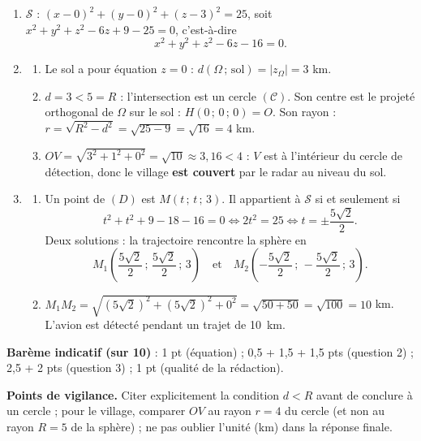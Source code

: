 \documentclass[11pt]{article}
\begin{document}
\begin{corrige}
\begin{enumerate}
\item $\mathcal{S}$ : $(x-0)^2+(y-0)^2+(z-3)^2=25$, soit $x^2+y^2+z^2-6z+9-25=0$, c'est-à-dire
\[x^2+y^2+z^2-6z-16=0.\]
\item 
\begin{enumerate}
\item Le sol a pour équation $z=0$ : $d(\Omega\,;\,\text{sol})=|z_\Omega|=3$ km.
\item $d=3<5=R$ : l'intersection est un cercle $(\mathcal{C})$. Son centre est le projeté orthogonal de $\Omega$ sur le sol : $H(0\,;\,0\,;\,0)=O$. Son rayon : $r=\sqrt{R^2-d^2}=\sqrt{25-9}=\sqrt{16}=4$ km.
\item $OV=\sqrt{3^2+1^2+0^2}=\sqrt{10}\approx 3{,}16<4$ : $V$ est à l'intérieur du cercle de détection, donc le village \textbf{est couvert} par le radar au niveau du sol.
\end{enumerate}
\item 
\begin{enumerate}
\item Un point de $(D)$ est $M(t\,;\,t\,;\,3)$. Il appartient à $\mathcal{S}$ si et seulement si
\[t^2+t^2+9-18-16=0 \iff 2t^2=25 \iff t=\pm\dfrac{5\sqrt{2}}{2}.\]
Deux solutions : la trajectoire rencontre la sphère en
\[M_1\left(\dfrac{5\sqrt{2}}{2}\,;\,\dfrac{5\sqrt{2}}{2}\,;\,3\right) \quad\text{et}\quad M_2\left(-\dfrac{5\sqrt{2}}{2}\,;\,-\dfrac{5\sqrt{2}}{2}\,;\,3\right).\]
\item $M_1M_2=\sqrt{\left(5\sqrt{2}\right)^2+\left(5\sqrt{2}\right)^2+0^2}=\sqrt{50+50}=\sqrt{100}=10$ km. L'avion est détecté pendant un trajet de \SI{10}{km}.
\end{enumerate}
\end{enumerate}
\textbf{Barème indicatif (sur 10)} : 1 pt (équation) ; 0,5 + 1,5 + 1,5 pts (question 2) ; 2,5 + 2 pts (question 3) ; 1 pt (qualité de la rédaction).

\textbf{Points de vigilance.} Citer explicitement la condition $d<R$ avant de conclure à un cercle ; pour le village, comparer $OV$ au rayon $r=4$ du cercle (et non au rayon $R=5$ de la sphère) ; ne pas oublier l'unité (km) dans la réponse finale.
\end{corrige}
\end{document}
